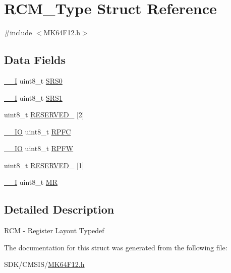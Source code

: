 \hypertarget{struct_r_c_m___type}{}\section{R\+C\+M\+\_\+\+Type Struct Reference}
\label{struct_r_c_m___type}


{\ttfamily \#include $<$M\+K64\+F12.\+h$>$}

\subsection*{Data Fields}
\begin{DoxyCompactItemize}
\item 
\mbox{\hyperlink{core__cm4_8h_af63697ed9952cc71e1225efe205f6cd3}{\+\_\+\+\_\+I}} uint8\+\_\+t \mbox{\hyperlink{group___v_r_e_f___peripheral___access___layer_ga41d4e6ae9fb47445146929d15e97153f}{S\+R\+S0}}
\item 
\mbox{\hyperlink{core__cm4_8h_af63697ed9952cc71e1225efe205f6cd3}{\+\_\+\+\_\+I}} uint8\+\_\+t \mbox{\hyperlink{group___v_r_e_f___peripheral___access___layer_ga2164524ec77565baad264a25fbc65378}{S\+R\+S1}}
\item 
uint8\+\_\+t \mbox{\hyperlink{group___v_r_e_f___peripheral___access___layer_ga1d386ff4b328960f430b4c63f61423fa}{R\+E\+S\+E\+R\+V\+E\+D\+\_}} \mbox{[}2\mbox{]}
\item 
\mbox{\hyperlink{core__cm4_8h_aec43007d9998a0a0e01faede4133d6be}{\+\_\+\+\_\+\+IO}} uint8\+\_\+t \mbox{\hyperlink{group___v_r_e_f___peripheral___access___layer_gadb3a6cb8a3c37e9a55ab12962d0983d1}{R\+P\+FC}}
\item 
\mbox{\hyperlink{core__cm4_8h_aec43007d9998a0a0e01faede4133d6be}{\+\_\+\+\_\+\+IO}} uint8\+\_\+t \mbox{\hyperlink{group___v_r_e_f___peripheral___access___layer_ga9423324babed28ac7e0a6990356c8cb1}{R\+P\+FW}}
\item 
uint8\+\_\+t \mbox{\hyperlink{group___v_r_e_f___peripheral___access___layer_ga83b2d6f5756a9b0aa609216190380d5f}{R\+E\+S\+E\+R\+V\+E\+D\+\_}} \mbox{[}1\mbox{]}
\item 
\mbox{\hyperlink{core__cm4_8h_af63697ed9952cc71e1225efe205f6cd3}{\+\_\+\+\_\+I}} uint8\+\_\+t \mbox{\hyperlink{group___v_r_e_f___peripheral___access___layer_gaab9056b0fa2520560ed862f6bbde62d5}{MR}}
\end{DoxyCompactItemize}


\subsection{Detailed Description}
R\+CM -\/ Register Layout Typedef 

The documentation for this struct was generated from the following file\+:\begin{DoxyCompactItemize}
\item 
S\+D\+K/\+C\+M\+S\+I\+S/\mbox{\hyperlink{_m_k64_f12_8h}{M\+K64\+F12.\+h}}\end{DoxyCompactItemize}
